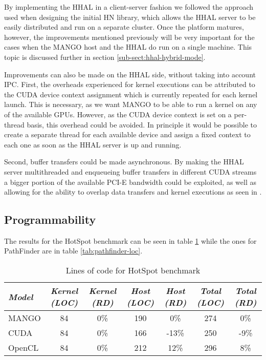 By implementing the HHAL in a client-server fashion we followed the approach used when designing the initial HN library, which allows the HHAL server to be easily distributed and run on a separate cluster. Once the platform matures, however, the improvements mentioned previously will be very important for the cases when the MANGO host and the HHAL do run on a single machine. This topic is discussed further in section \ref{sub-sect:hhal-hybrid-mode}.

Improvements can also be made on the HHAL side, without taking into account IPC. First, the overheads experienced for kernel executions can be attributed to the CUDA device context assignment which is currently repeated for each kernel launch. This is necessary, as we want MANGO to be able to run a kernel on any of the available GPUs. However, as the CUDA device context is set on a per-thread basis, this overhead could be avoided. In principle it would be possible to create a separate thread for each available device and assign a fixed context to each one as soon as the HHAL server is up and running.

Second, buffer transfers could be made asynchronous. By making the HHAL server multithreaded and enqueueing buffer transfers in different CUDA streams a bigger portion of the available PCI-E bandwidth could be exploited, as well as allowing for the ability to overlap data transfers and kernel executions as seen in \cite{overlap-data-transfers-cuda}.

\subsection{Programmability}

The results for the HotSpot benchmark can be seen in table \ref{tab:hotspot-loc} while the ones for PathFinder are in table \ref{tab:pathfinder-loc}.

\begin{table}
    \centering
    \begin{tabular}{l|c|c|c|c|c|c}
    \textit{Model} & \textit{Kernel (LOC)} & \textit{Kernel (RD)} & \textit{Host (LOC)} & \textit{Host (RD)} & \textit{Total (LOC)} & \textit{Total (RD)} \\ \hline
    MANGO & 84 & 0\% & 190 & 0\% & 274 & 0\% \\
    CUDA & 84 & 0\% & 166 & -13\% & 250 & -9\% \\
    OpenCL & 84 & 0\% & 212 & 12\% & 296 & 8\%  
    \end{tabular}
    \captionsetup{justification=centering}
    \caption{Lines of code for HotSpot benchmark}
    \label{tab:hotspot-loc}
\end{table}

